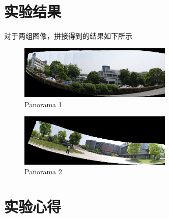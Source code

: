 \documentclass{article}
\begin{document}

\section{实验结果}
对于两组图像，拼接得到的结果如下所示
\begin{figure}[H]
\begin{center}
\includegraphics[width=0.65\textwidth]{output1} %
\caption{Panorama 1}
\end{center}
\end{figure}

\begin{figure}[H]
\begin{center}
\includegraphics[width=0.65\textwidth]{output2} %
\caption{Panorama 2}
\end{center}
\end{figure}


\section{实验心得}

\end{document}
